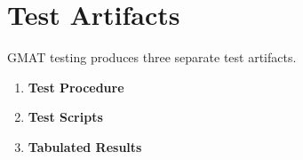 \chapter{Test Artifacts}

GMAT testing produces three separate test artifacts.  

\begin{enumerate}
\item \textbf{Test Procedure}
\item \textbf{Test Scripts}
\item \textbf{Tabulated Results}
\end{enumerate} 


